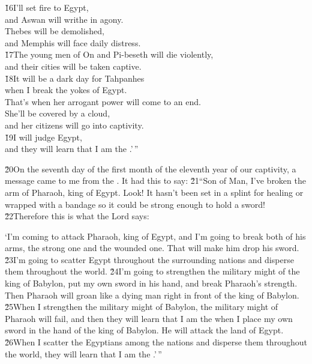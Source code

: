 \begin{poetry}
\poeml \v{16}I'll set fire to Egypt, \\
\poemll    and Aswan will writhe in agony. \\
\poeml Thebes will be demolished, \\
\poemll    and Memphis will face daily distress. \\
\poeml \v{17}The young men of On and Pi-beseth will die violently, \\
\poemll    and their cities will be taken captive. \\
\poeml \v{18}It will be a dark day for Tahpanhes \\
\poemll    when I break the yokes of Egypt. \\
\poeml That's when her arrogant power will come to an end. \\
\poemll    She'll be covered by a cloud, \\
\poemlll       and her citizens will go into captivity. \\
\poeml \v{19}I will judge Egypt, \\
\poemll    and they will learn that I am the .'\,''
\end{poetry}

\v{20}On the seventh day of the first month of the eleventh year of our captivity, a message came to me from the . It had this to say: \v{21}``Son of Man, I've broken the arm of Pharaoh, king of Egypt. Look! It hasn't been set in a splint for healing or wrapped with a bandage so it could be strong enough to hold a sword! \v{22}Therefore this is what the Lord  says:

`I'm coming to attack Pharaoh, king of Egypt, and I'm going to break both of his arms, the strong one and the wounded one. That will make him drop his sword. \v{23}I'm going to scatter Egypt throughout the surrounding nations and disperse them throughout the world. \v{24}I'm going to strengthen the military might of the king of Babylon, put my own sword in his hand, and break Pharaoh's strength. Then Pharaoh will groan like a dying man right in front of the king of Babylon. \v{25}When I strengthen the military might of Babylon, the military might of Pharaoh will fail, and then they will learn that I am the  when I place my own sword in the hand of the king of Babylon. He will attack the land of Egypt. \v{26}When I scatter the Egyptians among the nations and disperse them throughout the world, they will learn that I am the .'\,''

